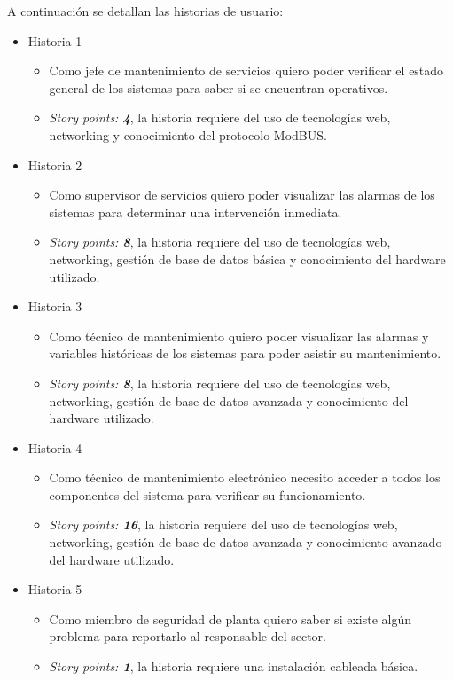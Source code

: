 \documentclass[
11pt, %
]{charter}
\begin{document}
A continuación se detallan las historias de usuario:

\begin{itemize}
	\item Historia 1 
\begin{itemize}
	\item Como jefe de mantenimiento de servicios quiero poder verificar el estado general de los sistemas para saber si se encuentran operativos. 
	\item\textit{Story points: \textbf{4}}, la historia requiere del uso de tecnologías web, networking y conocimiento del protocolo ModBUS.
\end{itemize}
	\item Historia 2
\begin{itemize}
	\item Como supervisor de servicios quiero poder visualizar las alarmas de los sistemas para determinar una intervención inmediata.
	\item \textit{Story points: \textbf{8}}, la historia requiere del uso de tecnologías web, networking, gestión de base de datos básica y conocimiento del hardware utilizado.
\end{itemize}
	\item Historia 3
\begin{itemize}
	\item Como técnico de mantenimiento quiero poder visualizar las alarmas y variables históricas de los sistemas para poder asistir su mantenimiento.
	\item \textit{Story points: \textbf{8}}, la historia requiere del uso de tecnologías web, networking, gestión de base de datos avanzada y conocimiento del hardware utilizado.
\end{itemize}
	\item Historia 4
\begin{itemize}
	\item Como técnico de mantenimiento electrónico necesito acceder a todos los componentes del sistema para verificar su funcionamiento.
	\item \textit{Story points: \textbf{16}}, la historia requiere del uso de tecnologías web, networking, gestión de base de datos avanzada y conocimiento avanzado del hardware utilizado.
\end{itemize}
	\item Historia 5
\begin{itemize}
	\item Como miembro de seguridad de planta quiero saber si existe algún problema para reportarlo al responsable del sector.
	\item \textit{Story points: \textbf{1}}, la historia requiere una instalación cableada básica.
\end{itemize}

\end{itemize}
\end{document}
